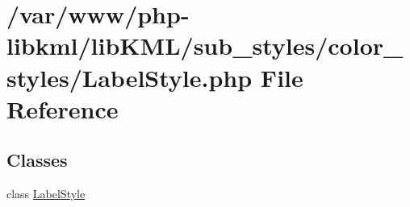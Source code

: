 \hypertarget{LabelStyle_8php}{
\section{/var/www/php-\/libkml/libKML/sub\_\-styles/color\_\-styles/LabelStyle.php File Reference}
\label{dc/db9/LabelStyle_8php}
}
\subsection*{Classes}
\begin{DoxyCompactItemize}
\item 
class \hyperlink{classLabelStyle}{LabelStyle}
\end{DoxyCompactItemize}
